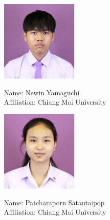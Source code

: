 \documentclass[final,isne,project]{cpecmu}
\author{นายเนวิน ยามากุชิ}{Newin Yamaguchi}{630615028}
\author{นางสาวพัชราภรณ์ สท้านไตรภพ}{Patcharaporn Satantaipop}{630615035}
\begin{document}


\pagestyle{empty}\cleardoublepage
\normalspacing \setcounter{page}{1}  \pagestyle{cpecmu}





\ifproject

\fi



\ifproject

\normalspacing
\appendix


\ifglossary\glossarypage\fi

\ifindex\indexpage\fi

\begin{biosketch}
\begin{figure}[H]
\center
  \begin{minipage}{0.45\textwidth}
    \begin{center}
      \includegraphics[width=1.5in]{./img/newin_photo.jpg}
    \end{center}
    \begin{center}
      \textsf{Name: Newin Yamaguchi} \\
      \textsf{Affiliation: Chiang Mai University} \\
    \end{center}
  \end{minipage}
  \begin{minipage}{0.45\textwidth}
    \begin{center}
      \includegraphics[width=1.5in]{./img/may_photo.jpg}
    \end{center}
    \begin{center}
      \textsf{Name: Patcharaporn Satantaipop} \\
      \textsf{Affiliation: Chiang Mai University} \\
    \end{center}
  \end{minipage}
\end{figure}


\end{biosketch}
\end{document}
